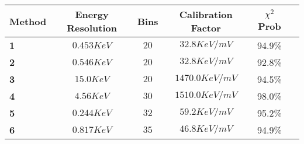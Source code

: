 \begin{center}
\begin{tabular}[pos]{|l|c|c|c|c|c|}
		\hline
		\textbf{Method}&\textbf{Energy Resolution}&\textbf{Bins}&\textbf{Calibration Factor}&\textbf{$\chi^2$ Prob}\\
		\hline
		\textbf{1}&$0.453\unit{KeV}$&$20$&$32.8\unit{ {KeV} \per{mV} }$&94.9\%\\
		\textbf{2}&$0.546\unit{KeV}$&$20$&$32.8\unit{ {KeV} \per{mV} }$&92.8\%\\
		\textbf{3}&$15.0\unit{KeV}$&$20$&$1470.0\unit{ {KeV} \per{mV} }$&94.5\%\\
		\textbf{4}&$4.56\unit{KeV}$&$30$&$1510.0\unit{ {KeV} \per{mV} }$&98.0\%\\
		\textbf{5}&$0.244\unit{KeV}$&$32$&$59.2\unit{ {KeV} \per{mV} }$&95.2\%\\
		\textbf{6}&$0.817\unit{KeV}$&$35$&$46.8\unit{ {KeV} \per{mV} }$&94.9\%\\
		\hline
\end{tabular}
\end{center}